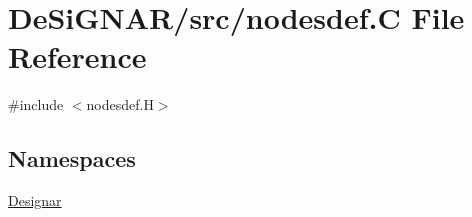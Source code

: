 \hypertarget{nodesdef_8_c}{}\section{De\+Si\+G\+N\+A\+R/src/nodesdef.C File Reference}
\label{nodesdef_8_c}
{\ttfamily \#include $<$nodesdef.\+H$>$}\newline
\subsection*{Namespaces}
\begin{DoxyCompactItemize}
\item 
 \hyperlink{namespace_designar}{Designar}
\end{DoxyCompactItemize}
